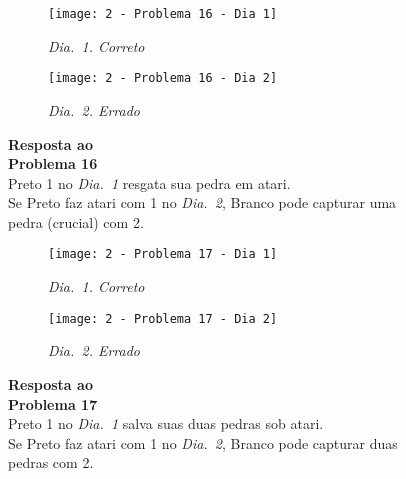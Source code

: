 \begin{SCfigure}[][h!]
    \begin{subfigure}[t]{.31\textwidth}
        \texttt{[image: 2 - Problema 16 - Dia 1]}
        \captionsetup{justification=centering}
        \caption*{\emph{Dia.\@~1. Correto}}
    \end{subfigure}
    \hfill
    \begin{subfigure}[t]{.31\textwidth}
        \texttt{[image: 2 - Problema 16 - Dia 2]}
        \captionsetup{justification=centering}
        \caption*{\emph{Dia.\@~2. Errado}}
    \end{subfigure}
    \hfill
    \caption*{\textbf{Resposta ao\\Problema 16}\\\vspace*{.25cm}Preto 1 no \emph{Dia.\@~1} resgata sua pedra em atari.\\\vspace*{.25cm}Se Preto faz atari com 1 no \emph{Dia.\@~2}, Branco pode capturar uma pedra (crucial) com 2.}
\end{SCfigure}

\vfill

\begin{SCfigure}[][h!]
    \begin{subfigure}[t]{.31\textwidth}
        \texttt{[image: 2 - Problema 17 - Dia 1]}
        \captionsetup{justification=centering}
        \caption*{\emph{Dia.\@~1. Correto}}
    \end{subfigure}
    \hfill
    \begin{subfigure}[t]{.31\textwidth}
        \texttt{[image: 2 - Problema 17 - Dia 2]}
        \captionsetup{justification=centering}
        \caption*{\emph{Dia.\@~2. Errado}}
    \end{subfigure}
    \hfill
    \caption*{\textbf{Resposta ao\\Problema 17}\\\vspace*{.25cm}Preto 1 no \emph{Dia.\@~1} salva suas duas pedras sob atari.\\\vspace*{.25cm}Se Preto faz atari com 1 no \emph{Dia.\@~2}, Branco pode capturar duas pedras com 2.}
\end{SCfigure}

\vfill

